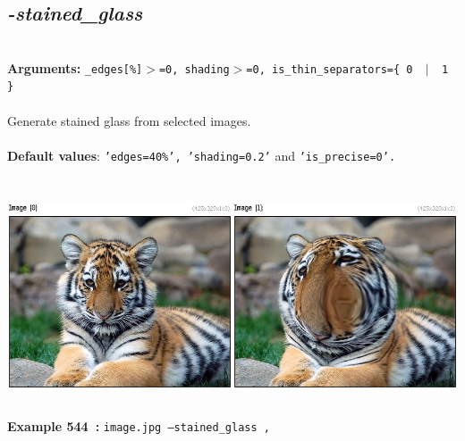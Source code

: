 \documentclass[a4paper,11pt,twoside]{book}
\begin{document}
\subsection{\emph{-stained\_glass} }\vspace*{-0.5em}
~\\\textbf{Arguments: } 
{\small \texttt{\_edges[\%]$>$=0, shading$>$=0, is\_thin\_separators=\{ 0 ~$|$~ 1 \}}}\\~\\
Generate stained glass from selected images.
~\\~\\\textbf{Default values}: {\small \texttt{'edges=40\%', 'shading=0.2'} and \texttt{'is\_precise=0'.}}
\begin{center}\includegraphics[keepaspectratio=true,height=7cm,width=\textwidth]{img/gmic_def544.jpg}\\
{\footnotesize \textbf{Example 544~:} \texttt{image.jpg --stained\_glass ,}}
\end{center}
\end{document}
